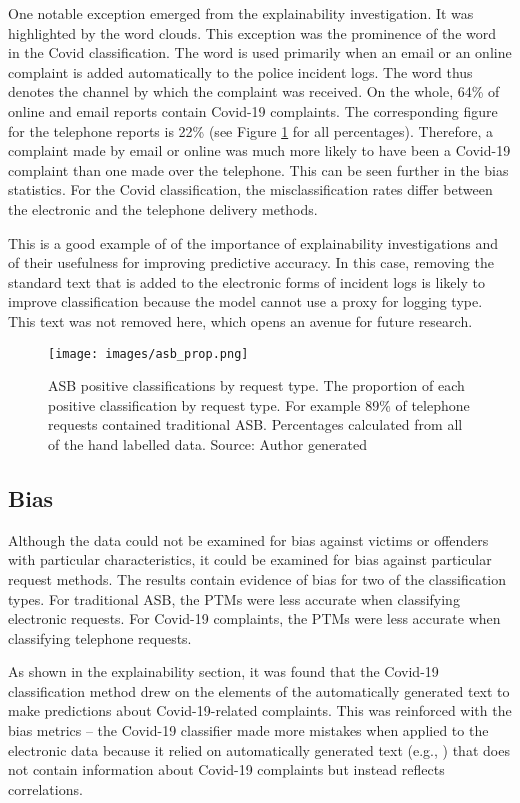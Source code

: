 One notable exception emerged from the explainability investigation. It was highlighted by the word clouds. This exception was the prominence of the word  in the Covid classification. The word  is used primarily when an email or an online complaint is added automatically to the police incident logs. The word thus denotes the channel by which the complaint was received. On the whole, 64\% of online and email reports contain Covid-19 complaints. The corresponding figure for the telephone reports is 22\% (see Figure \ref{fig: asb_prop} for all percentages). Therefore, a complaint made by email or online was much more likely to have been a Covid-19 complaint than one made over the telephone. This can be seen further in the bias statistics. For the Covid classification, the misclassification rates differ between the electronic and the telephone delivery methods.

This is a good example of of the importance of explainability investigations and of their usefulness for improving predictive accuracy. In this case, removing the standard text that is added to the electronic forms of incident logs is likely to improve classification because the model cannot use a proxy for logging type. This text was not removed here, which opens an avenue for future research.

 \begin{figure}[h]
    \texttt{[image: images/asb\_prop.png]}
    \caption[Proportion of ASB classification by request type.]{{ASB positive classifications by request type.} The proportion of each positive classification by request type. For example 89\% of telephone requests contained traditional ASB. Percentages calculated from all of the hand labelled data. Source: Author generated}
    \label{fig: asb_prop}
\end{figure}

\subsection{Bias}Although the data could not be examined for bias against victims or offenders with particular characteristics, it could be examined for bias against particular request methods. The results contain evidence of bias for two of the classification types. For traditional ASB, the PTMs were less accurate when classifying electronic requests. For Covid-19 complaints, the PTMs were less accurate when classifying telephone requests.

As shown in the explainability section, it was found that the Covid-19 classification method drew on the elements of the automatically generated text to make predictions about Covid-19-related complaints. This was reinforced with the bias metrics – the Covid-19 classifier made more mistakes when applied to the electronic data because it relied on automatically generated text (e.g., ) that does not contain information about Covid-19 complaints but instead reflects correlations.


